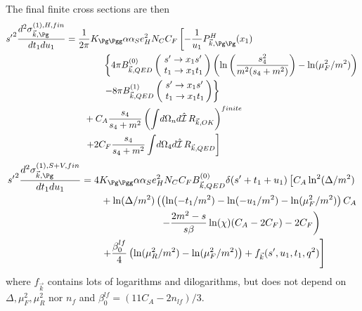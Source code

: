 The final finite cross sections are then
\begin{align}
{s'}^2\frac{d^2\sigma_{\vec k,\Pg}^{(1),H,fin}}{dt_1du_1} &=\frac{1}{2\pi}K_{\Pg\Pgg}\alpha\alpha_Se_H^2N_CC_F\left[-\frac 1 {u_1}P^H_{\vec k,\Pg\Pg}(x_1)\right. \nonumber\\
 &\hspace{40pt}\left\{4\pi B^{(0)}_{\vec k,QED}\left(\!\begin{array}{l}s'\rightarrow x_1s'\\t_1\rightarrow x_1 t_1\end{array}\!\!\right) \left(\ln\left(\frac{s_4^2}{m^2(s_4+m^2)}\right)-\ln(\mu_F^2/m^2)\right)\right. \nonumber\\
 &\hspace{40pt}\left.-8\pi B^{(1)}_{\vec k,QED}\left(\!\begin{array}{l}s'\rightarrow x_1s'\\t_1\rightarrow x_1 t_1\end{array}\!\!\right)\right\} \nonumber\\
 &\hspace{20pt}+C_A\frac{s_4}{s_4+m^2}\left(\int\!d\Omega_nd\hat{\mathcal I}\,R_{\vec k,OK}\right)^{finite} \nonumber\\
 &\hspace{20pt}\left.+2C_F\frac{s_4}{s_4+m^2}\int\!d\Omega_4d\hat{\mathcal I}\,R_{\vec k,QED}\right]
\end{align}
\begin{align}
{s'}^2\frac{d^2\sigma_{\vec k,\Pg}^{(1),S+V,fin}}{dt_1du_1} &=4K_{\Pg\Pgg}\alpha\alpha_Se_H^2N_CC_FB^{(0)}_{\vec k,QED}\delta(s'+t_1+u_1)\left[C_A\ln^2(\Delta/m^2) \right.\nonumber\\
 &\hspace{20pt} + \ln(\Delta/m^2)\left(\left(\ln(-t_1/m^2)-\ln(-u_1/m^2)-\ln(\mu_F^2/m^2)\right)C_A \right. \nonumber\\
 &\hspace{80pt} \left. - \frac{2m^2-s}{s\beta}\ln(\chi)(C_A-2C_F) - 2C_F\right) \nonumber\\
 &\hspace{20pt}\left. + \frac {\beta_0^{lf}}{4}\left(\ln(\mu_R^2/m^2)- \ln(\mu_F^2/m^2)\right) +  f_{\vec k}(s',u_1,t_1,q^2)\right]
\end{align}
where $f_{\vec k}$ contains lots of logarithms and dilogarithms, but does not depend on $\Delta,\mu_F^2,\mu_R^2$ nor $n_f$ and $\beta_0^{lf} = (11C_A - 2n_{lf})/3$.
